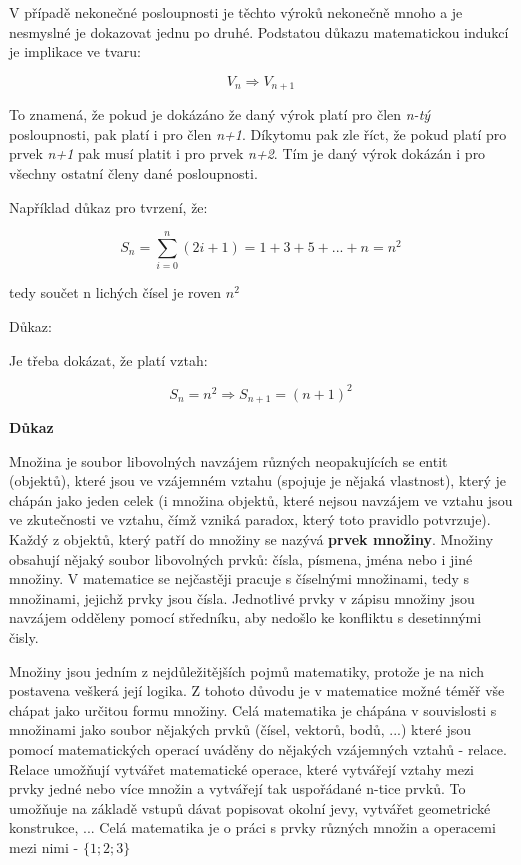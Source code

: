 V případě nekonečné posloupnosti je těchto výroků nekonečně mnoho a je nesmyslné je dokazovat jednu po druhé. Podstatou důkazu matematickou indukcí je implikace ve tvaru:

$$ V_n \Rightarrow V_{n+1} $$

To znamená, že pokud je dokázáno že daný výrok platí pro člen {\it n-tý} posloupnosti, pak platí i pro člen {\it n+1}. Díkytomu pak zle říct, že pokud platí pro prvek {\it n+1} pak musí platit i pro prvek {\it n+2}. Tím je daný výrok dokázán i pro všechny ostatní členy dané posloupnosti. 

Například důkaz pro tvrzení, že:

$$ S_n = \sum^n_{i=0} (2i+1) = 1 + 3 + 5 + ... + n = n^2 $$ 

tedy součet n lichých čísel je roven $n^2$

Důkaz:

Je třeba dokázat, že platí vztah:

$$ S_n = n^2 \Rightarrow S_{n+1} = (n+1)^2 $$


{\bf Důkaz} 


Množina je soubor libovolných navzájem různých neopakujících se entit (objektů), které jsou ve vzájemném vztahu (spojuje je nějaká vlastnost), který je chápán jako jeden celek (i množina objektů, které nejsou navzájem ve vztahu jsou ve zkutečnosti ve vztahu, čímž vzniká paradox, který toto pravidlo potvrzuje). Každý z objektů, který patří do množiny se nazývá {\bf prvek množiny}.  Množiny obsahují nějaký soubor libovolných prvků: čísla, písmena, jména nebo i jiné množiny. V matematice se nejčastěji pracuje s číselnými množinami, tedy s množinami, jejichž prvky jsou čísla. Jednotlivé prvky v zápisu množiny jsou navzájem odděleny pomocí středníku, aby nedošlo ke konfliktu s desetinnými čisly.

Množiny jsou jedním z nejdůležitějších pojmů matematiky, protože je na nich postavena veškerá její logika. Z tohoto důvodu je v matematice možné téměř vše chápat jako určitou formu množiny. Celá matematika je chápána v souvislosti s množinami jako soubor nějakých prvků (čísel, vektorů, bodů, ...) které jsou pomocí matematických operací uváděny do nějakých vzájemných vztahů - relace. Relace umožňují vytvářet matematické operace, které vytvářejí vztahy mezi prvky jedné nebo více množin a vytvářejí tak uspořádané n-tice prvků. To umožňuje na základě vstupů dávat popisovat okolní jevy, vytvářet geometrické konstrukce, ... Celá matematika je o práci s prvky různých množin a operacemi mezi nimi - $\{1; 2; 3 \}$

